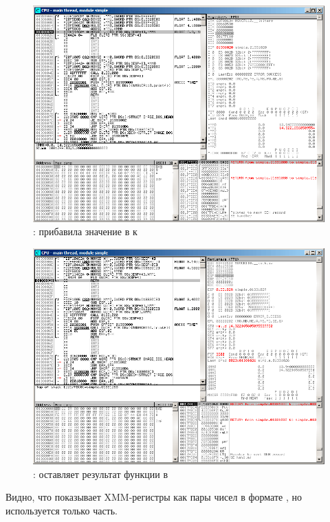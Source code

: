 \clearpage
\begin{figure}[H]
\centering
\includegraphics[scale=\FigScale]{patterns/205_floating_SIMD/simple_olly4.png}
\caption{\olly:  прибавила значение в  к }
\label{fig:FPU_SIMD_simple_olly4}
\end{figure}

\clearpage
\begin{figure}[H]
\centering
\includegraphics[scale=\FigScale]{patterns/205_floating_SIMD/simple_olly5.png}
\caption{\olly: \FLD оставляет результат функции в }
\label{fig:FPU_SIMD_simple_olly5}
\end{figure}

Видно, что \olly показывает XMM-регистры как пары чисел в формате \Tdouble,
но используется только  часть.

